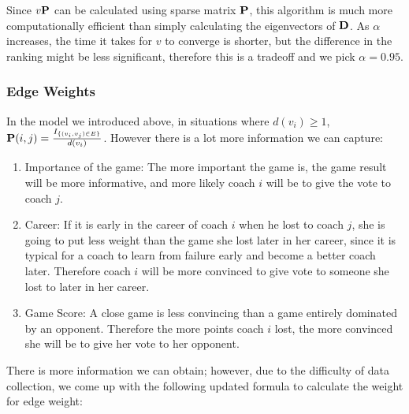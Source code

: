 \documentclass[11pt,notitlepage]{article}
\begin{document}
\vspace{5mm}

\begin{algorithm}[H]
\begin{algorithmic}
\EndWhile
{}
\end{algorithmic}
\end{algorithm}

\vspace{5mm}

\noindent Since $v {\bf P}$ can be calculated using sparse matrix ${\bf P}$, this algorithm is much more computationally efficient than simply calculating the eigenvectors of ${\bf D}$. As $\alpha$ increases, the time it takes for $v$ to converge is shorter, but the difference in the ranking might be less significant, therefore this is a tradeoff and we pick $\alpha = 0.95$.

\subsubsection*{Edge Weights}

\noindent In the model we introduced above, in situations where $d(v_i) \geq 1$, ${\bf P}(i, j) = \frac{ I_{\{(v_i, v_j) \in E\}}}{d(v_i)}$. However there is a lot more information we can capture:

\begin{enumerate}
\item Importance of the game: The more important the game is, the game result will be more informative, and more likely coach $i$ will be to give the vote to coach $j$.
\item Career: If it is early in the career of coach $i$ when he lost to coach $j$, she is going to put less weight than the game she lost later in her career, since it is typical for a coach to learn from failure early and become a better coach later. Therefore coach $i$ will be more convinced to give vote to someone she lost to later in her career.
\item Game Score: A close game is less convincing than a game entirely dominated by an opponent. Therefore the more points coach $i$ lost, the more convinced she will be to give her vote to her opponent.
\end{enumerate}

\noindent There is more information we can obtain; however, due to the difficulty of data collection, we come up with the following updated formula to calculate the weight for edge weight:
\\
\end{document}
